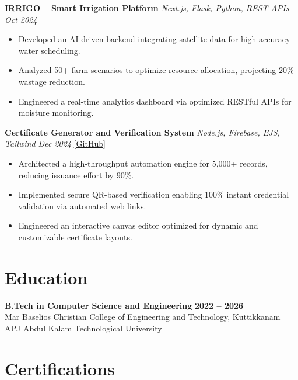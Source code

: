 \documentclass[a4paper,10pt]{article}
\begin{document}
\vspace{4pt}

\textbf{IRRIGO -- Smart Irrigation Platform} \hfill \textit{Next.js, Flask, Python, REST APIs \quad Oct 2024}
\begin{itemize}
\item Developed an AI-driven backend integrating satellite data for high-accuracy water scheduling.
\item Analyzed 50+ farm scenarios to optimize resource allocation, projecting 20\% wastage reduction.
\item Engineered a real-time analytics dashboard via optimized RESTful APIs for moisture monitoring.
\end{itemize}

\vspace{4pt}

\textbf{Certificate Generator and Verification System} \hfill \textit{Node.js, Firebase, EJS, Tailwind \quad Dec 2024} \quad \href{https://github.com/bbinxx/advanced-certificate-generator}{[GitHub]}
\begin{itemize}
\item Architected a high-throughput automation engine for 5,000+ records, reducing issuance effort by 90\%.
\item Implemented secure QR-based verification enabling 100\% instant credential validation via automated web links.
\item Engineered an interactive canvas editor optimized for dynamic and customizable certificate layouts.
\end{itemize}

\section*{Education}

\textbf{B.Tech in Computer Science and Engineering} \hfill \textbf{2022 -- 2026}\\
Mar Baselios Christian College of Engineering and Technology, Kuttikkanam \hfill APJ Abdul Kalam Technological University

\section*{Certifications}
\end{document}

